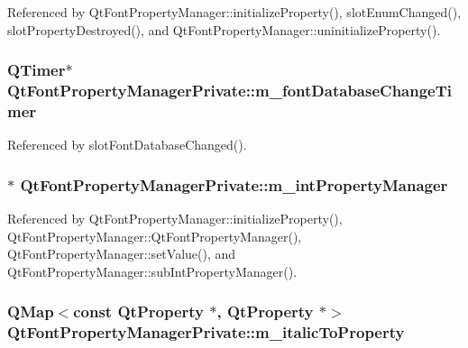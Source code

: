 Referenced by Qt\+Font\+Property\+Manager\+::initialize\+Property(), slot\+Enum\+Changed(), slot\+Property\+Destroyed(), and Qt\+Font\+Property\+Manager\+::uninitialize\+Property().

\subsubsection[{m\+\_\+font\+Database\+Change\+Timer}]{\setlength{\rightskip}{0pt plus 5cm}Q\+Timer$\ast$ Qt\+Font\+Property\+Manager\+Private\+::m\+\_\+font\+Database\+Change\+Timer}\label{classQtFontPropertyManagerPrivate_ae7648fdd7db39712e4e863971f2a1991}


Referenced by slot\+Font\+Database\+Changed().

\subsubsection[{m\+\_\+int\+Property\+Manager}]{$\ast$ Qt\+Font\+Property\+Manager\+Private\+::m\+\_\+int\+Property\+Manager}\label{classQtFontPropertyManagerPrivate_a931576a87982101a66880ad561624810}


Referenced by Qt\+Font\+Property\+Manager\+::initialize\+Property(), Qt\+Font\+Property\+Manager\+::\+Qt\+Font\+Property\+Manager(), Qt\+Font\+Property\+Manager\+::set\+Value(), and Qt\+Font\+Property\+Manager\+::sub\+Int\+Property\+Manager().

\subsubsection[{m\+\_\+italic\+To\+Property}]{\setlength{\rightskip}{0pt plus 5cm}Q\+Map$<$const {\bf Qt\+Property} $\ast$, {\bf Qt\+Property} $\ast$$>$ Qt\+Font\+Property\+Manager\+Private\+::m\+\_\+italic\+To\+Property}\label{classQtFontPropertyManagerPrivate_af9fa0fd4fc6033bbba6508d8f9b45be4}


